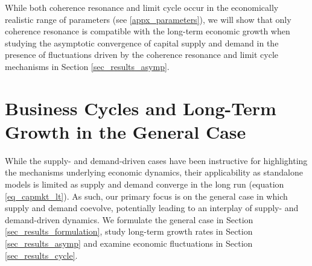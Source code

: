 \documentclass[authoryear, review]{elsarticle}
\begin{document}
While both coherence resonance and limit cycle occur in the economically realistic range of parameters (see \ref{appx_parameters}), we will show that only coherence resonance is compatible with the long-term economic growth when studying the asymptotic convergence of capital supply and demand in the presence of fluctuations driven by the coherence resonance and limit cycle mechanisms in Section \ref{sec_results_asymp}. 


\section{Business Cycles and Long-Term Growth in the General Case}\label{sec_results}
While the supply- and demand-driven cases have been instructive for highlighting the mechanisms underlying economic dynamics, their applicability as standalone models is limited as supply and demand converge in the long run (equation \eqref{eq_capmkt_lt}). As such, our primary focus is on the general case in which supply and demand coevolve, potentially leading to an interplay of supply- and demand-driven dynamics. 
We formulate the general case in Section \ref{sec_results_formulation}, study long-term growth rates in Section \ref{sec_results_asymp} and examine economic fluctuations in Section \ref{sec_results_cycle}.
\end{document}
